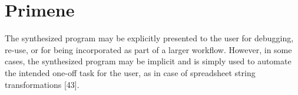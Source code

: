\section{Primene}
\label{sec:primene}


The synthesized program may be explicitly presented to the user for debugging, re-use, or for being  incorporated as part of a larger workflow. However, in some cases, the synthesized program may be implicit and is simply used to automate the intended one-off task for the user, as in case of spreadsheet string transformations [43].
